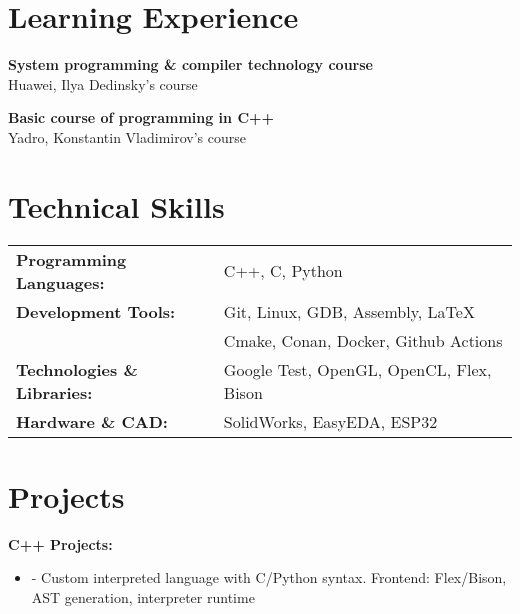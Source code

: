 \documentclass[a4paper,10pt]{article}
\begin{document}
\begin{adjustbox}{valign=t}
\begin{minipage}[t]{0.6\textwidth}

\section*{Learning Experience}
\begin{description}[leftmargin=!,labelwidth=2em]
\item[\textcolor{ColorOne}{2023-2024}] \textbf{System programming \& compiler technology course} \\ Huawei, Ilya Dedinsky's course
\item[\textcolor{ColorOne}{2024-2025}] \textbf{Basic course of programming in C++} \\ Yadro, Konstantin Vladimirov's course
\end{description}

\section*{Technical Skills}
\vspace{-0.2cm}
\begin{tabular}{@{}l l@{}}
\textbf{Programming Languages:}     & C++, C, Python \\
\textbf{Development Tools:}         & Git, Linux, GDB, Assembly, \LaTeX\\
& Cmake, Conan, Docker, Github Actions\\
\textbf{Technologies \& Libraries:} & Google Test, OpenGL, OpenCL, Flex, Bison \\
\textbf{Hardware \& CAD:}           & SolidWorks, EasyEDA, ESP32
\end{tabular}

\section*{Projects}
\vspace{-0.2cm}

\textbf{C++ Projects:}
\begin{itemize}
\item {} - Custom interpreted language with C/Python syntax. Frontend: Flex/Bison, AST generation, interpreter runtime


\end{itemize}
\end{minipage}
\end{adjustbox}
\end{document}
